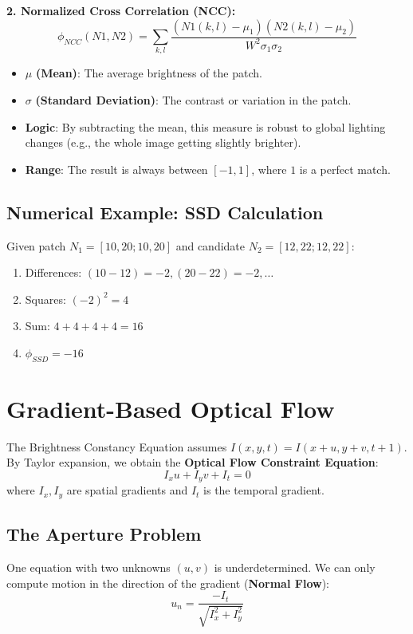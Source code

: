 \documentclass{report}
\begin{document}
\textbf{2. Normalized Cross Correlation (NCC):}
\begin{equation}
    \phi_{NCC}(N1,N2)=\sum_{k,l}\frac{(N1(k,l)-\mu_{1})(N2(k,l)-\mu_{2})}{W^{2}\sigma_{1}\sigma_{2}}
\end{equation}
\begin{itemize}
    \item $\mu$ \textbf{(Mean)}: The average brightness of the patch.
    \item $\sigma$ \textbf{(Standard Deviation)}: The contrast or variation in the patch.
    \item \textbf{Logic}: By subtracting the mean, this measure is robust to global lighting changes (e.g., the whole
          image getting slightly brighter).
    \item \textbf{Range}: The result is always between $[-1, 1]$, where $1$ is a perfect match.
\end{itemize}

\subsection{Numerical Example: SSD Calculation}
Given patch $N_1 = [10, 20; 10, 20]$ and candidate $N_2 = [12, 22; 12, 22]$:
\begin{enumerate}
    \item Differences: $(10-12)=-2, (20-22)=-2, \dots$
    \item Squares: $(-2)^2 = 4$
    \item Sum: $4 + 4 + 4 + 4 = 16$
    \item $\phi_{SSD} = -16$
\end{enumerate}

\section{Gradient-Based Optical Flow}
The Brightness Constancy Equation assumes $I(x,y,t) = I(x+u, y+v, t+1)$. By Taylor expansion, we obtain the \textbf{Optical Flow Constraint Equation}:
\begin{equation}
    I_x u + I_y v + I_t = 0
\end{equation}
where $I_x, I_y$ are spatial gradients and $I_t$ is the temporal gradient.

\subsection{The Aperture Problem}
One equation with two unknowns $(u, v)$ is underdetermined. We can only compute motion in the direction of the gradient (\textbf{Normal Flow}):
\begin{equation}
    u_n = \frac{-I_t}{\sqrt{I_x^2 + I_y^2}}
\end{equation}
\end{document}
